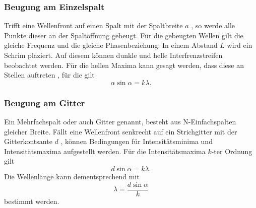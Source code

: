 \subsubsection{ Beugung am Einzelspalt}
\label{sec:Beugung am Einzelspalt}

Trifft eine Wellenfront auf einen Spalt mit der Spaltbreite $a$ , so werde  alle Punkte dieser an der Spaltöffnung gebeugt.
Für die gebeugten Wellen gilt die gleiche Frequenz und die gleiche Phasenbeziehung. In einem Abstand $L$ wird ein 
Schrim plaziert. Auf diesem können dunkle und helle Interfrenzstreifen beobachtet werden. Für die hellen Maxima kann gesagt 
werden, dass diese an Stellen auftreten , für die gilt
\begin{equation}
    \alpha \sin \alpha = k \lambda.
\end{equation}

\subsubsection{ Beugung am Gitter}
\label{sec:Beugung am Gitter}

Ein Mehrfachspalt oder auch Gitter genannt, besteht aus N-Einfachspalten gleicher Breite. Fällt eine Wellenfront
senkrecht auf ein Strichgitter mit der Gitterkontsante $d$ , können Bedingungen für Intensitätsminima und Intensitätsmaxima
aufgestellt werden.
Für die Intensitätsmaxima $k$-ter Ordnung gilt
\begin{equation}
    d \sin \alpha = k \lambda.
\end{equation}
Die Wellenlänge kann dementsprechend mit 
\begin{equation}
     \lambda = \frac{d \sin \alpha}{k}
     \label{eqn:well}
\end{equation}
bestimmt werden.